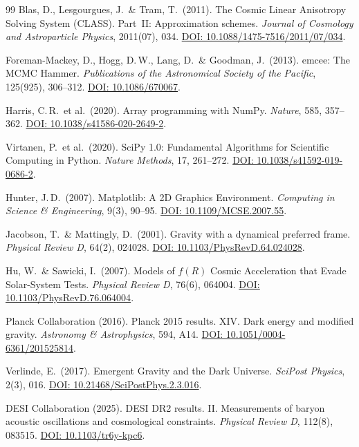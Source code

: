 \documentclass[aps,prd,twocolumn,superscriptaddress,nofootinbib]{revtex4-2}
\begin{document}
\begin{thebibliography}{99}
Blas, D., Lesgourgues, J.\ \& Tram, T.\ (2011).
The Cosmic Linear Anisotropy Solving System (CLASS). Part~II: Approximation schemes.
\textit{Journal of Cosmology and Astroparticle Physics}, 2011(07), 034.
\href{https://doi.org/10.1088/1475-7516/2011/07/034}{DOI: 10.1088/1475-7516/2011/07/034}.

Foreman-Mackey, D., Hogg, D.\,W., Lang, D.\ \& Goodman, J.\ (2013).
emcee: The MCMC Hammer.
\textit{Publications of the Astronomical Society of the Pacific}, 125(925), 306--312.
\href{https://doi.org/10.1086/670067}{DOI: 10.1086/670067}.

Harris, C.\,R.\ et al.\ (2020).
Array programming with NumPy.
\textit{Nature}, 585, 357--362.
\href{https://doi.org/10.1038/s41586-020-2649-2}{DOI: 10.1038/s41586-020-2649-2}.

Virtanen, P.\ et al.\ (2020).
SciPy 1.0: Fundamental Algorithms for Scientific Computing in Python.
\textit{Nature Methods}, 17, 261--272.
\href{https://doi.org/10.1038/s41592-019-0686-2}{DOI: 10.1038/s41592-019-0686-2}.

Hunter, J.\,D.\ (2007).
Matplotlib: A 2D Graphics Environment.
\textit{Computing in Science \& Engineering}, 9(3), 90--95.
\href{https://doi.org/10.1109/MCSE.2007.55}{DOI: 10.1109/MCSE.2007.55}.

Jacobson, T.\ \& Mattingly, D.\ (2001).
Gravity with a dynamical preferred frame.
\textit{Physical Review D}, 64(2), 024028.
\href{https://doi.org/10.1103/PhysRevD.64.024028}{DOI: 10.1103/PhysRevD.64.024028}.

Hu, W.\ \& Sawicki, I.\ (2007).
Models of $f(R)$ Cosmic Acceleration that Evade Solar-System Tests.
\textit{Physical Review D}, 76(6), 064004.
\href{https://doi.org/10.1103/PhysRevD.76.064004}{DOI: 10.1103/PhysRevD.76.064004}.

Planck Collaboration (2016).
Planck 2015 results. XIV. Dark energy and modified gravity.
\textit{Astronomy \& Astrophysics}, 594, A14.
\href{https://doi.org/10.1051/0004-6361/201525814}{DOI: 10.1051/0004-6361/201525814}.

Verlinde, E.\ (2017).
Emergent Gravity and the Dark Universe.
\textit{SciPost Physics}, 2(3), 016.
\href{https://doi.org/10.21468/SciPostPhys.2.3.016}{DOI: 10.21468/SciPostPhys.2.3.016}.

DESI Collaboration (2025).
DESI DR2 results. II. Measurements of baryon acoustic oscillations and cosmological constraints.
\textit{Physical Review D}, 112(8), 083515.
\href{https://doi.org/10.1103/tr6y-kpc6}{DOI: 10.1103/tr6y-kpc6}.


\end{thebibliography}
\end{document}
